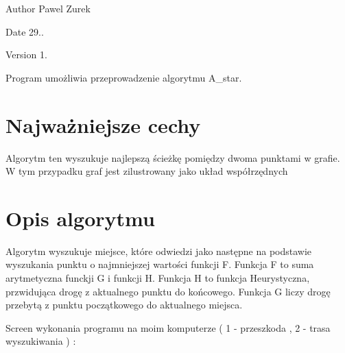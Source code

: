 \begin{DoxyAuthor}{Author}
Pawel Zurek 
\end{DoxyAuthor}
\begin{DoxyDate}{Date}
29.. 
\end{DoxyDate}
\begin{DoxyVersion}{Version}
1.
\end{DoxyVersion}
Program umożliwia przeprowadzenie algorytmu A\-\_\-star.\hypertarget{index_etykieta-wazne-cechy}{}\section{Najważniejsze cechy}\label{index_etykieta-wazne-cechy}
Algorytm ten wyszukuje najlepszą ścieżkę pomiędzy dwoma punktami w grafie. W tym przypadku graf jest zilustrowany jako układ współrzędnych\hypertarget{index_etykieta-op-algorytm}{}\section{Opis algorytmu}\label{index_etykieta-op-algorytm}
Algorytm wyszukuje miejsce, które odwiedzi jako następne na podstawie wyszukania punktu o najmniejszej wartości funkcji F. Funkcja F to suma arytmetyczna funckji G i funkcji H. Funkcja H to funkcja Heurystyczna, przwidująca drogę z aktualnego punktu do końcowego. Funkcja G liczy drogę przebytą z punktu początkowego do aktualnego miejsca.

\par
 Screen wykonania programu na moim komputerze ( 1 -\/ przeszkoda , 2 -\/ trasa wyszukiwania ) \-:


